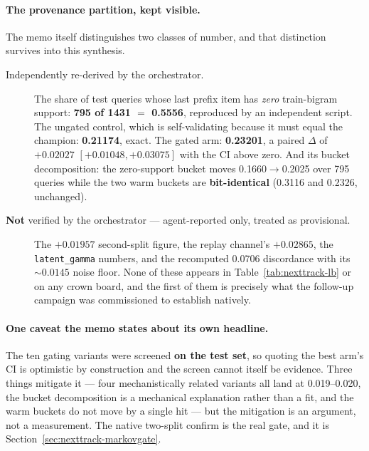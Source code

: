 \documentclass[11pt]{article}
\begin{document}
\paragraph{The provenance partition, kept visible.} The memo itself distinguishes
two classes of number, and that distinction survives into this synthesis.
\begin{description}
  \item[Independently re-derived by the orchestrator.] The share of test queries
  whose last prefix item has \emph{zero} train-bigram support:
  \textbf{\num{795} of \num{1431} $=$ \num{0.5556}}, reproduced by an independent
  script. The ungated control, which is self-validating because it must equal the
  champion: \textbf{\num{0.21174}}, exact. The gated arm: \textbf{\num{0.23201}},
  a paired $\Delta$ of $+\num{0.02027}$ $[+\num{0.01048}, +\num{0.03075}]$ with the
  CI above zero. And its bucket decomposition: the zero-support bucket moves
  \num{0.1660}$\to$\num{0.2025} over \num{795} queries while the two warm buckets
  are \textbf{bit-identical} (\num{0.3116} and \num{0.2326}, unchanged).
  \item[\textbf{Not} verified by the orchestrator --- agent-reported only, treated
  as provisional.] The $+\num{0.01957}$ second-split figure, the replay channel's
  $+\num{0.02865}$, the \texttt{latent\_gamma} numbers, and the recomputed
  \num{0.0706} discordance with its ${\sim}\num{0.0145}$ noise floor. None of these
  appears in Table~\ref{tab:nexttrack-lb} or on any crown board, and the first of them is
  precisely what the follow-up campaign was commissioned to establish natively.
\end{description}

\paragraph{One caveat the memo states about its own headline.} The ten gating
variants were screened \textbf{on the test set}, so quoting the best arm's CI is
optimistic by construction and the screen cannot itself be evidence. Three things
mitigate it --- four mechanistically related variants all land at
\numrange{0.019}{0.020}, the bucket decomposition is a mechanical explanation
rather than a fit, and the warm buckets do not move by a single hit --- but the
mitigation is an argument, not a measurement. The native two-split confirm is the
real gate, and it is Section~\ref{sec:nexttrack-markovgate}.
\end{document}
